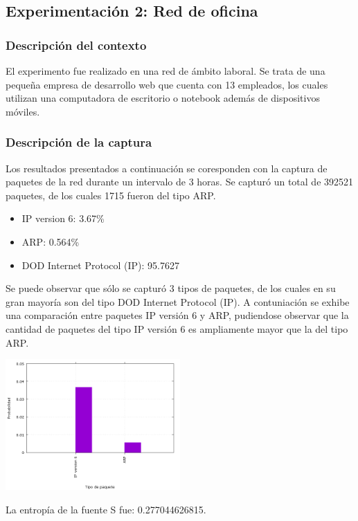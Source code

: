 
\subsection{Experimentaci\'on 2: Red de oficina}

\subsubsection{Descripci\'on del contexto}
El experimento fue realizado en una red de ámbito laboral. Se trata de una pequeña empresa de desarrollo web que cuenta con 13 empleados, los cuales utilizan una computadora de escritorio o notebook además de dispositivos móviles.

\subsubsection{Descripci\'on de la captura}
Los resultados presentados a continuación se coresponden con la captura de paquetes de la red durante un intervalo de 3 horas.
Se capturó un total de 392521 paquetes, de los cuales 1715 fueron del tipo ARP.
\begin{itemize}
\item IP version 6: 3.67\%
\item ARP: 0.564\%
\item DOD Internet Protocol (IP): 95.7627%
\end{itemize}
Se puede observar que sólo se capturó 3 tipos de paquetes, de los cuales en su gran mayoría son del tipo DOD Internet Protocol (IP).
A contuniación se exhibe una comparación entre paquetes IP versión 6 y ARP, pudiendose observar que la cantidad de paquetes del tipo IP versión 6 es ampliamente mayor que la del tipo ARP.
\begin{center}
\includegraphics[width=0.5\textwidth]{exp2-graficos/grafico1exp2.png}
\end{center}

La entrop\'ia de la fuente S fue: 0.277044626815.\newline

